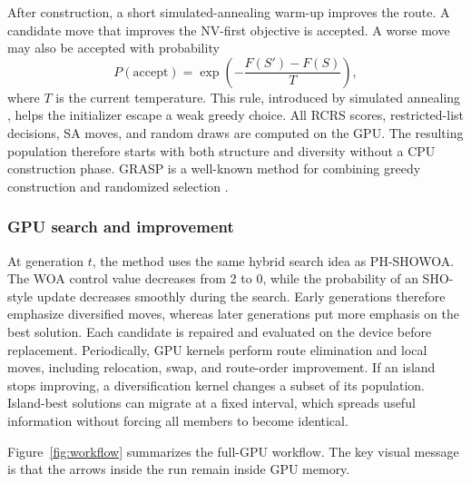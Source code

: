 \documentclass[pdflatex,sn-mathphys-num]{sn-jnl}
\begin{document}
After construction, a short simulated-annealing warm-up improves the route. A candidate move that improves the NV-first objective is accepted. A worse move may also be accepted with probability
\begin{equation}
 P(\text{accept})=\exp\left(-\frac{F(S')-F(S)}{T}\right),
\label{eq:sa}
\end{equation}
where $T$ is the current temperature. This rule, introduced by simulated annealing \cite{kirkpatrick1983optimization}, helps the initializer escape a weak greedy choice. All RCRS scores, restricted-list decisions, SA moves, and random draws are computed on the GPU. The resulting population therefore starts with both structure and diversity without a CPU construction phase. GRASP is a well-known method for combining greedy construction and randomized selection \cite{feo1995greedy}.

\subsubsection{GPU search and improvement}

At generation $t$, the method uses the same hybrid search idea as PH-SHOWOA. The WOA control value decreases from 2 to 0, while the probability of an SHO-style update decreases smoothly during the search. Early generations therefore emphasize diversified moves, whereas later generations put more emphasis on the best solution. Each candidate is repaired and evaluated on the device before replacement. Periodically, GPU kernels perform route elimination and local moves, including relocation, swap, and route-order improvement. If an island stops improving, a diversification kernel changes a subset of its population. Island-best solutions can migrate at a fixed interval, which spreads useful information without forcing all members to become identical.

Figure~\ref{fig:workflow} summarizes the full-GPU workflow. The key visual message is that the arrows inside the run remain inside GPU memory.
\end{document}
